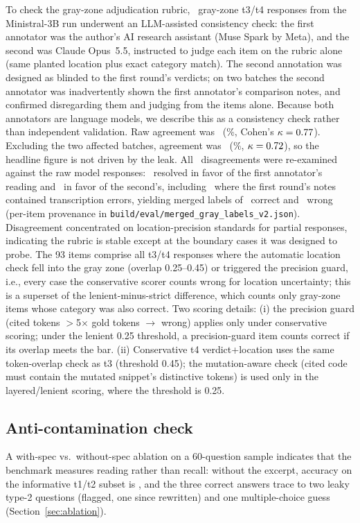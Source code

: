 \documentclass[11pt]{article}
\begin{document}
To check the gray-zone adjudication rubric, \AdjudN\ gray-zone t3/t4 responses from the Ministral-3B run underwent an LLM-assisted consistency check: the first annotator was the author's AI research assistant (Muse Spark by Meta), and the second was Claude Opus~5.5, instructed to judge each item on the rubric alone (same planted location plus exact category match). The second annotation was designed as blinded to the first round's verdicts; on two batches the second annotator was inadvertently shown the first annotator's comparison notes, and confirmed disregarding them and judging from the items alone. Because both annotators are language models, we describe this as a consistency check rather than independent validation. Raw agreement was \AdjudAgree\ (\AdjudAgreePct\%, Cohen's $\kappa=0.77$). Excluding the two affected batches, agreement was \AdjudNoLeakAgree\ (\AdjudNoLeakAgreePct\%, $\kappa=0.72$), so the headline figure is not driven by the leak. All \AdjudDisagree\ disagreements were re-examined against the raw model responses: \AdjudVOneWins\ resolved in favor of the first annotator's reading and \AdjudVTwoWins\ in favor of the second's, including \AdjudFirstTranscriptionErr\ where the first round's notes contained transcription errors, yielding merged labels of \AdjudMergedOK\ correct and \AdjudMergedWrong\ wrong (per-item provenance in \texttt{build/eval/merged\_gray\_labels\_v2.json}). Disagreement concentrated on location-precision standards for partial responses, indicating the rubric is stable except at the boundary cases it was designed to probe. The 93 items comprise all t3/t4 responses where the automatic location check fell into the gray zone (overlap 0.25--0.45) or triggered the precision guard, i.e., every case the conservative scorer counts wrong for location uncertainty; this is a superset of the lenient-minus-strict difference, which counts only gray-zone items whose category was also correct. Two scoring details: (i) the precision guard (cited tokens $>$5$\times$ gold tokens $\to$ wrong) applies only under conservative scoring; under the lenient 0.25 threshold, a precision-guard item counts correct if its overlap meets the bar. (ii) Conservative t4 verdict+location uses the same token-overlap check as t3 (threshold 0.45); the mutation-aware check (cited code must contain the mutated snippet's distinctive tokens) is used only in the layered/lenient scoring, where the threshold is 0.25.

\subsection{Anti-contamination check}
A with-spec vs.\ without-spec ablation on a 60-question sample indicates that the benchmark measures reading rather than recall: without the excerpt, accuracy on the informative t1/t2 subset is \AblWithoutToneTwo, and the three correct answers trace to two leaky type-2 questions (flagged, one since rewritten) and one multiple-choice guess (Section~\ref{sec:ablation}).
\end{document}

